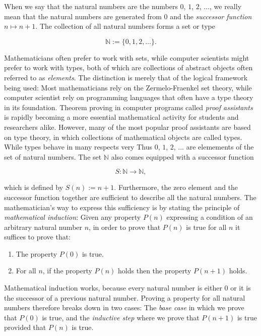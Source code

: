 \documentclass{article}
\theoremstyle{definition}
\theoremstyle{remark}
\begin{document}
When we say that the natural numbers are the numbers $0$, $1$, $2$, $\ldots$, we really mean that the natural numbers are generated from $0$ and the \emph{successor function} $n\mapsto n+1$. The collection of all natural numbers forms a set or type

\begin{equation}
  \mathbb{N}:=\{0,1,2,\ldots\}.
\end{equation}

Mathematicians often prefer to work with sets, while computer scientists might prefer to work with types, both of which are collections of abstract objects often referred to as \emph{elements}. The distinction is merely that of the logical framework being used: Most mathematicians rely on the Zermelo-Fraenkel set theory, while computer scientist rely on programming languages that often have a type theory in its foundation. Theorem proving in computer programs called \emph{proof assistants} is rapidly becoming a more essential mathematical activity for students and researchers alike. However, many of the most popular proof assistants are based on type theory, in which collections of mathematical objects are called types. While types behave in many respects very Thus $0$, $1$, $2$, $\ldots$ are elemements of the set of natural numbers. The set $\mathbb{N}$ also comes equipped with a successor function

\begin{equation*}
  S : \mathbb{N} \to \mathbb{N},
\end{equation*}

which is defined by $S(n):=n+1$. Furthermore, the zero element and the successor function together are sufficient to describe all the natural numbers. The mathematician's way to express this sufficiency is by stating the principle of \emph{mathematical induction}: Given any property $P(n)$ expressing a condition of an arbitrary natural number $n$, in order to prove that $P(n)$ is true for all $n$ it suffices to prove that:
\begin{enumerate}
\item The property $P(0)$ is true.
\item For all $n$, if the property $P(n)$ holds then the property $P(n+1)$ holds.
\end{enumerate}
Mathematical induction works, because every natural number is either $0$ or it is the successor of a previous natural number. Proving a property for all natural numbers therefore breaks down in two cases: The \emph{base case} in which we prove that $P(0)$ is true, and the \emph{inductive step} where we prove that $P(n+1)$ is true provided that $P(n)$ is true.
\end{document}
